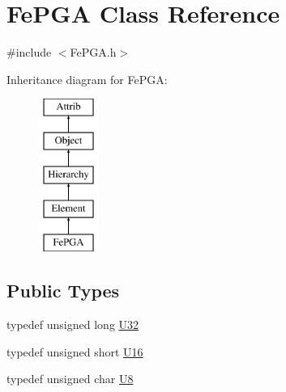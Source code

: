 \hypertarget{classFePGA}{}\section{Fe\+P\+GA Class Reference}
\label{classFePGA}


{\ttfamily \#include $<$Fe\+P\+G\+A.\+h$>$}

Inheritance diagram for Fe\+P\+GA\+:\begin{figure}[H]
\begin{center}
\leavevmode
\includegraphics[height=5.000000cm]{classFePGA}
\end{center}
\end{figure}
\subsection*{Public Types}
\begin{DoxyCompactItemize}
\item 
typedef unsigned long \hyperlink{classFePGA_a1d44a0b27d13179bb1dceb5ec6f4cc1f}{U32}
\item 
typedef unsigned short \hyperlink{classFePGA_ac84b20a342a6c963cba061c8bdc37651}{U16}
\item 
typedef unsigned char \hyperlink{classFePGA_ab65d84dbbc4b5711eb4d85d00c5abfa2}{U8}
\end{DoxyCompactItemize}
